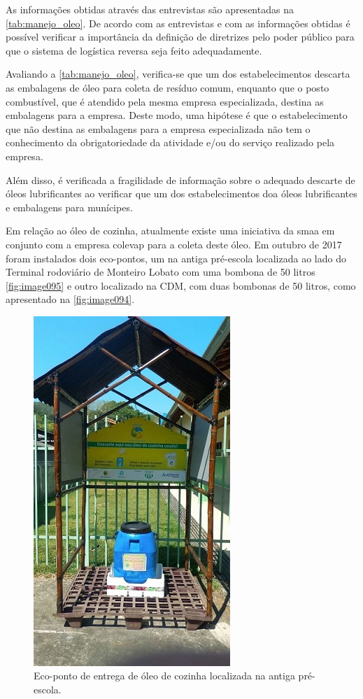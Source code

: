 \begin{description}
	
	As informações obtidas através das entrevistas são apresentadas na \autoref{tab:manejo_oleo}. De acordo com as entrevistas e com as informações obtidas é possível verificar a importância da definição de diretrizes pelo poder público para que o sistema de logística reversa seja feito adequadamente.
	
	Avaliando a \autoref{tab:manejo_oleo}, verifica-se que um dos estabelecimentos descarta as embalagens de óleo para coleta de resíduo comum, enquanto que o posto combustível, que é atendido pela mesma empresa especializada, destina as embalagens para a empresa. Deste modo, uma hipótese é que o estabelecimento que não destina as embalagens para a empresa especializada não tem o conhecimento da obrigatoriedade da atividade e/ou do serviço realizado pela empresa.
	
	Além disso, é verificada a fragilidade de informação sobre o adequado descarte de óleos lubrificantes ao verificar que um dos estabelecimentos doa óleos lubrificantes e embalagens para munícipes.
	
	
	
	Em relação ao óleo de cozinha, atualmente existe uma iniciativa da \gls{smaa} em conjunto com a empresa \gls{colevap} para a coleta deste óleo. Em outubro de 2017 foram instalados dois eco-pontos, um na antiga pré-escola localizada ao lado do Terminal rodoviário de Monteiro Lobato com uma bombona de 50 litros \autoref{fig:image095} e outro localizado na CDM, com duas bombonas de 50 litros, como apresentado na \autoref{fig:image094}.
	
	
	\begin{figure}
		\centering
		\includegraphics[width=0.40\linewidth]{produtos/prodtres/image095}
		\caption{Eco-ponto de entrega de óleo de cozinha localizada na antiga pré-escola.}
		\label{fig:image095}
	\end{figure}
	

\end{description}
